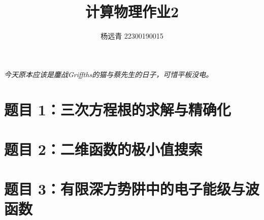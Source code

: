 \documentclass[11pt]{article}
\author{杨远青 22300190015}
\title{计算物理作业2}
\begin{document}
\maketitle
\textit{今天原本应该是鏖战Griffths的猫与蔡先生的日子，可惜平板没电。}
\section{题目 1：三次方程根的求解与精确化}


\section{题目 2：二维函数的极小值搜索}


\section{题目 3：有限深方势阱中的电子能级与波函数}


\vspace{5pt}
\end{document}
